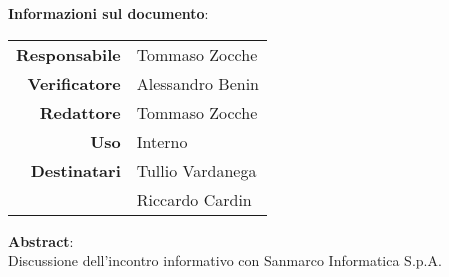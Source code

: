 \begin{center}
\textbf{Informazioni sul documento}: \\
\vspace{0.5cm}

\begin{tabular}{r|l}
    \textbf{Responsabile} & Tommaso Zocche \\
    \textbf{Verificatore} & Alessandro Benin \\ 
    \textbf{Redattore} & Tommaso Zocche \\
    \textbf{Uso} & Interno \\ 
    \textbf{Destinatari} & Tullio Vardanega \\ & Riccardo Cardin \\ 
\end{tabular}

\vfill

\textbf{Abstract}: \\
\vspace{0.5cm}
Discussione dell'incontro informativo con Sanmarco Informatica S.p.A.
\end{center}


\bigskip